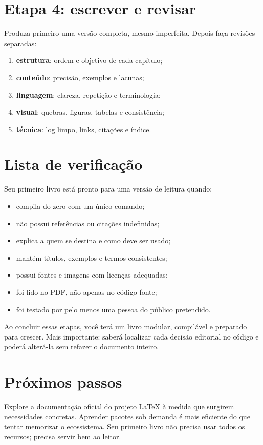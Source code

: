 \section{Etapa 4: escrever e revisar}

Produza primeiro uma versão completa, mesmo imperfeita. Depois faça revisões
separadas:

\begin{enumerate}
  \item \textbf{estrutura}: ordem e objetivo de cada capítulo;
  \item \textbf{conteúdo}: precisão, exemplos e lacunas;
  \item \textbf{linguagem}: clareza, repetição e terminologia;
  \item \textbf{visual}: quebras, figuras, tabelas e consistência;
  \item \textbf{técnica}: log limpo, links, citações e índice.
\end{enumerate}

\section{Lista de verificação}

Seu primeiro livro está pronto para uma versão de leitura quando:

\begin{itemize}
  \item compila do zero com um único comando;
  \item não possui referências ou citações indefinidas;
  \item explica a quem se destina e como deve ser usado;
  \item mantém títulos, exemplos e termos consistentes;
  \item possui fontes e imagens com licenças adequadas;
  \item foi lido no PDF, não apenas no código-fonte;
  \item foi testado por pelo menos uma pessoa do público pretendido.
\end{itemize}

\begin{resultado}
  Ao concluir essas etapas, você terá um livro modular, compilável e preparado
  para crescer. Mais importante: saberá localizar cada decisão editorial no
  código e poderá alterá-la sem refazer o documento inteiro.
\end{resultado}

\section*{Próximos passos}

Explore a documentação oficial do projeto LaTeX \citep{latex-project} à medida
que surgirem necessidades concretas. Aprender pacotes sob demanda é mais
eficiente do que tentar memorizar o ecossistema. Seu primeiro livro não precisa
usar todos os recursos; precisa servir bem ao leitor.
